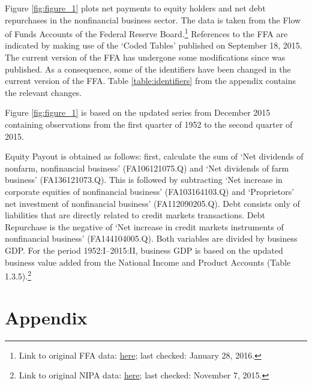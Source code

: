 \documentclass[12pt,a4paper,leqno]{article}
\begin{document}
Figure \ref{fig:figure_1} plots net payments to equity holders and net debt repurchases in the nonfinancial business sector. The data is taken from the Flow of Funds Accounts of the Federal Reserve Board.\footnote{Link to original FFA data: \href{http://www.federalreserve.gov/datadownload/Download.aspx?rel=Z1&series=1b491b6891f88f8604172bc2f3970d52&from=03/01/1952&to=06/30/2015&lastObs=&filetype=spreadsheetml&label=include&layout=seriescolumn}{here}; last checked: January 28, 2016.}
References to the FFA are indicated by making use of the ‘Coded Tables’ published on September 18, 2015. The current version of the FFA has undergone some modifications since \citet{JERMANNfinancial} was published. As a consequence, some of the identifiers have been changed in the current version of the FFA. Table \ref{table:identifiers} from the appendix contains the relevant changes.

Figure \ref{fig:figure_1} is based on the updated series from December 2015 containing observations from the first quarter of 1952 to the second quarter of 2015.

Equity Payout is obtained as follows: first, calculate the sum of ‘Net dividends of nonfarm, nonfinancial business’ (FA106121075.Q) and ‘Net dividends of farm business’ (FA136121073.Q). This is followed by subtracting ‘Net increase in corporate equities of nonfinancial business’ (FA103164103.Q) and ‘Proprietors’ net investment of nonfinancial business’ (FA112090205.Q). Debt consists only of liabilities that are directly related to credit markets transactions.  Debt Repurchase is the negative of ‘Net increase in credit markets instruments of nonfinancial business’ (FA144104005.Q).
Both variables are divided by business GDP. For the period 1952:I--2015:II, business GDP is based on the updated business value added from the National Income and Product Accounts (Table 1.3.5).\footnote{Link to original NIPA data: \href{http://www.bea.gov//national/nipaweb/DownSS2.asp}{here}; last checked: November 7, 2015.} 

\newpage
\vfill
{}




\newpage
\section*{Appendix}
\setcounter{table}{0}
\renewcommand{\thetable}{A\arabic{table}}
\end{document}
